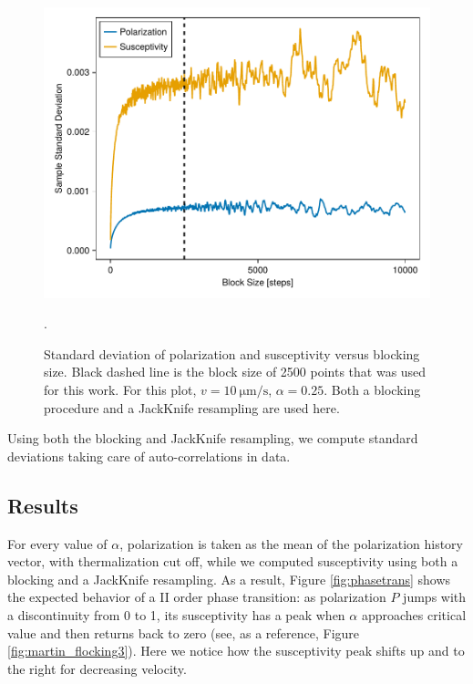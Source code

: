 \documentclass[../../master_thesis_np.tex]{subfiles}
\begin{document}
		\begin{figure}[hbtp]
			\centering
			\includegraphics[width= \singfigwidth]{phasetrans/blocksize_v10.pdf}
			\caption{Standard deviation of polarization and susceptivity versus blocking size. Black dashed line is the block size of 2500 points that was used for this work. For this plot, $v = \SI{10}{\um\per\second}$, $\alpha = 0.25$. Both a blocking procedure and a JackKnife resampling are used here.}.
			\label{fig:blocksize}
		\end{figure}
		
		Using both the blocking and JackKnife resampling, we compute standard deviations taking care of auto-correlations in data.
		
		
		\subsection{Results}
		
		For every value of $\alpha$, polarization is taken as the mean of the polarization history vector, with thermalization cut off, while we computed susceptivity using both a blocking and a JackKnife resampling.
		As a result, Figure \ref{fig:phasetrans} shows the expected behavior of a II order phase transition: as polarization $P$ jumps with a discontinuity from 0 to 1, its susceptivity has a peak when $\alpha$ approaches critical value and then returns back to zero (see, as a reference, Figure \ref{fig:martin_flocking3}).
		Here we notice how the susceptivity peak shifts up and to the right for decreasing velocity.
		
\end{document}
